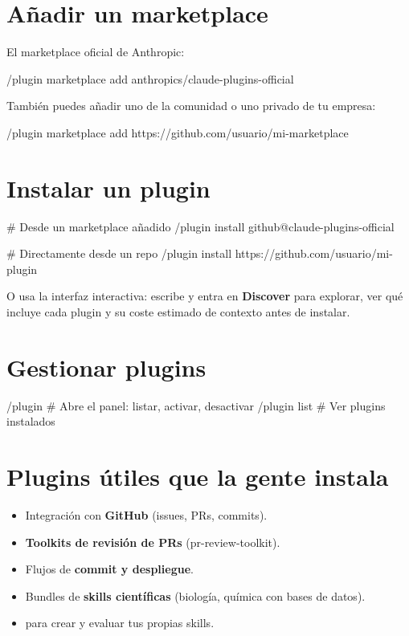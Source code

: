 \documentclass[11pt,a4paper]{report}
\DeclareRobustCommand{\texttt}[1]{{\ttfamily\seqsplit{#1}}}
\begin{document}
\section{Añadir un marketplace}

El marketplace oficial de Anthropic:

\begin{codebox}
/plugin marketplace add anthropics/claude-plugins-official
\end{codebox}

También puedes añadir uno de la comunidad o uno privado de tu empresa:

\begin{codebox}
/plugin marketplace add https://github.com/usuario/mi-marketplace
\end{codebox}

\section{Instalar un plugin}

\begin{codebox}
# Desde un marketplace añadido
/plugin install github@claude-plugins-official

# Directamente desde un repo
/plugin install https://github.com/usuario/mi-plugin
\end{codebox}

O usa la interfaz interactiva: escribe \texttt{/plugin} y entra en \textbf{Discover} para explorar, ver qué incluye cada plugin y su coste estimado de contexto antes de instalar.

\section{Gestionar plugins}

\begin{codebox}
/plugin           # Abre el panel: listar, activar, desactivar
/plugin list      # Ver plugins instalados
\end{codebox}

\section{Plugins útiles que la gente instala}

\begin{itemize}
\item Integración con \textbf{GitHub} (issues, PRs, commits).
\item \textbf{Toolkits de revisión de PRs} (pr-review-toolkit).
\item Flujos de \textbf{commit y despliegue}.
\item Bundles de \textbf{skills científicas} (biología, química con bases de datos).
\item \texttt{skill-creator} para crear y evaluar tus propias skills.
\end{itemize}
\end{document}
